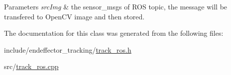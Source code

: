 \begin{DoxyParams}{\-Parameters}
{\em src\-Img} & the sensor\-\_\-msgs of \-R\-O\-S topic, the message will be transfered to \-Open\-C\-V image and then stored. \\
\hline
\end{DoxyParams}


\-The documentation for this class was generated from the following files\-:\begin{DoxyCompactItemize}
\item 
include/endeffector\-\_\-tracking/\hyperlink{track__ros_8h}{track\-\_\-ros.\-h}\item 
src/\hyperlink{track__ros_8cpp}{track\-\_\-ros.\-cpp}\end{DoxyCompactItemize}
